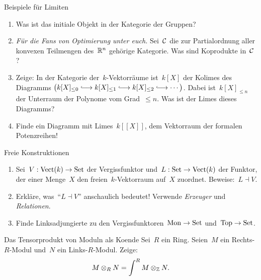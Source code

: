 \documentclass{uebblatt}
\begin{document}

\begin{aufgabe}{Beispiele für Limiten}
\begin{enumerate}
\item Was ist das initiale Objekt in der Kategorie der Gruppen?
\item \emph{Für die Fans von Optimierung unter euch.} Sei~$\mathcal{C}$ die zur
Partialordnung aller konvexen Teilmengen des~$\mathbb{R}^n$ gehörige Kategorie. Was
sind Koprodukte in~$\mathcal{C}$?
\item Zeige: In der Kategorie der~$k$-Vektorräume ist~$k[X]$ der Kolimes des
Diagramms $\bigl(k[X]_{\leq0} \lhra k[X]_{\leq1} \lhra k[X]_{\leq2} \lhra
\cdots \bigr)$. Dabei ist~$k[X]_{\leq n}$ der Unterraum der Polynome vom
Grad~$\leq n$. Was ist der Limes dieses Diagramms?
\item Finde ein Diagramm mit Limes~$k[[X]]$, dem Vektorraum
der formalen Potenzreihen!
\end{enumerate}
\end{aufgabe}

\begin{aufgabe}{Freie Konstruktionen}
\begin{enumerate}
\item Sei~$V : \mathrm{Vect}(k) \to \mathrm{Set}$ der Vergissfunktor und~$L : \mathrm{Set} \to
\mathrm{Vect}(k)$ der Funktor, der einer Menge~$X$ den freien~$k$-Vektorraum
auf~$X$ zuordnet. Beweise:~$L \dashv V$.
\item Erkläre, was~"`$L \dashv V$"' anschaulich bedeutet!
Verwende \emph{Erzeuger} und \emph{Relationen}.
\item Finde Linksadjungierte zu den Vergissfunktoren~$\mathrm{Mon} \to \mathrm{Set}$
und~$\mathrm{Top} \to \mathrm{Set}$.
\end{enumerate}
\end{aufgabe}

\begin{aufgabe}{Das Tensorprodukt von Moduln als Koende}
Sei~$R$ ein Ring. Seien~$M$ ein Rechts-$R$-Modul
und~$N$ ein Links-$R$-Modul. Zeige:
\[ M \otimes_R N = \int^R M \otimes_{\mathbb{Z}} N. \]
\vspace{-1.5em}
\end{aufgabe}
\end{document}
